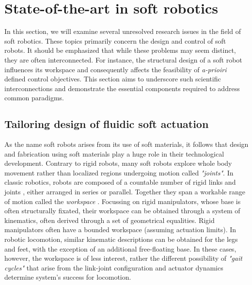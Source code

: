 \section{State-of-the-art in soft robotics}
In this section, we will examine several unresolved research issues in the field of soft robotics. These topics primarily concern the design and control of soft robots. It should be emphasized that while these problems may seem distinct, they are often interconnected. For instance, the structural design of a soft robot influences its workspace and consequently affects the feasibility of \textit{a-prioiri} defined control objectives. This section aims to underscore such scientific interconnections and demonstrate the essential components required to address common paradigms.

\subsection{Tailoring design of fluidic soft actuation}
As the name soft robots arises from its use of soft materials, it follows that design and fabrication using soft materials play a huge role in their technological development. Contrary to rigid robots, many soft robots explore whole body movement rather than localized regions undergoing motion called \textit{"joints"}. In classic robotics, robots are composed of a countable number of rigid links and joints \cite{Spong2006,Murray1994,Corke2011}, either arranged in series or parallel. Together they span a workable range of motion called the \textit{workspace} \cite{Spong2006}. Focussing on rigid manipulators, whose base is often structurally fixated, their workspace can be obtained through a system of kinematics, often derived through a set of geometrical equalities. Rigid manipulators often have a bounded workspace (assuming actuation limits). In robotic locomotion, similar kinematic descriptions can be obtained for the legs and feet, with the exception of an additional free-floating base. In these cases, however, the workspace is of less interest, rather the different possibility of \textit{"gait cycles"} that arise from the link-joint configuration and actuator dynamics determine system's success for locomotion.

